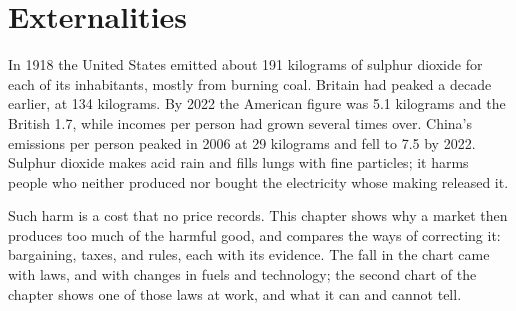 \chapter{Externalities}\label{ch:g11:externalities}

In 1918 the United States emitted about 191 kilograms of sulphur dioxide for each of its inhabitants, mostly from burning coal. Britain had
peaked a decade earlier, at 134 kilograms. By 2022 the American figure was 5.1 kilograms and the British 1.7, while incomes per person had grown
several times over. China's emissions per person peaked in 2006 at 29 kilograms and fell to 7.5 by 2022. Sulphur dioxide makes acid rain and fills
lungs with fine particles; it harms people who neither produced nor bought the electricity whose making released it.

Such harm is a cost that no price records. This chapter shows why a market then produces too much of the harmful good, and compares the ways of
correcting it: bargaining, taxes,  and rules, each with its evidence. The fall in the chart came with laws, and with changes in
fuels and technology; the second chart of the chapter shows one of those laws at work, and what it can and cannot tell.

